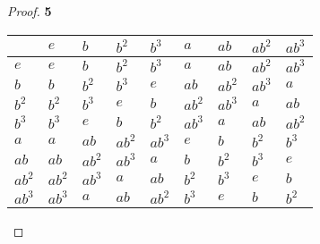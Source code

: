 \documentclass[11pt]{article}
\begin{document}
	\begin{proof}{\textbf{5}}\\ 
		\begin{adjustbox}{max width=\textwidth,center}
		\begin{tabular}{l|llllllll}
			    & $e$ & $b$ & $b^{2}$ & $b^{3}$ & $a$ & $ab$ & $ab^{2}$ & $ab^{3}$ \\ \hline
			$e$ & $e$ & $b$ & $b^{2}$ & $b^{3}$ & $a$ & $ab$ & $ab^{2}$ & $ab^{3}$ \\ 
			$b$ & $b$ & $b^{2}$ & $b^{3}$  & $e$ & $ab$ & $ab^{2}$ & $ab^{3}$ & $a$ \\
		$b^{2}$ & $b^{2}$ & $b^{3}$ & $e$ & $b$ & $ab^{2}$ & $ab^{3}$ & $a$ & $ab$ \\			
		$b^{3}$ & $b^{3}$ & $e$ & $b$ & $b^{2}$ & $ab^{3}$ & $a$ & $ab$ & $ab^{2}$ \\
		    $a$ & $a$ & $ab$ & $ab^{2}$ & $ab^{3}$ & $e$ & $b$ & $b^{2}$ & $b^{3}$ \\
		   $ab$ & $ab$ & $ab^{2}$ & $ab^{3}$ & $a$ & $b$ & $b^{2}$ & $b^{3}$ & $e$ \\
	   $ab^{2}$ & $ab^{2}$ & $ab^{3}$ & $a$ & $ab$ & $b^{2}$ & $b^{3}$ & $e$ & $b$\\
	   $ab^{3}$ & $ab^{3}$ & $a$ & $ab$ & $ab^{2}$ & $b^{3}$ & $e$ & $b$ & $b^{2}$\\
		\end{tabular}
		\end{adjustbox}
	\end{proof}
\cleardoublepage
\end{document}

